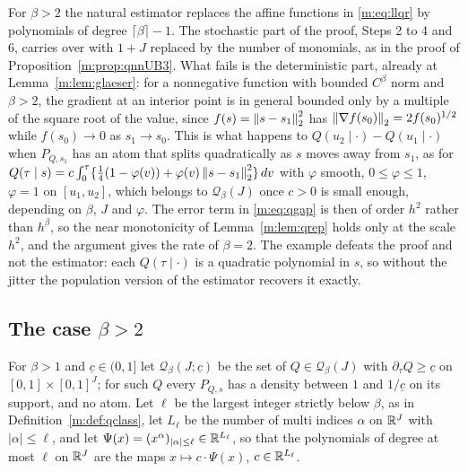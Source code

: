 \begin{remark}[Why the proof stops at $\beta=2$]\label{m:rem:qnnbeta}
For $\beta>2$ the natural estimator replaces the affine functions in \eqref{m:eq:llqr} by polynomials of degree $\lceil\beta\rceil-1$. The stochastic part of the proof, Steps 2 to 4 and 6, carries over with $1+J$ replaced by the number of monomials, as in the proof of Proposition~\ref{m:prop:qnnUB3}. What fails is the deterministic part, already at Lemma~\ref{m:lem:glaeser}: for a nonnegative function with bounded $C^\beta$ norm and $\beta>2$, the gradient at an interior point is in general bounded only by a multiple of the square root of the value, since $f(s)=\left\|s-s_1\right\|_2^2$ has $\left\|\nabla f(s_0)\right\|_2=2f(s_0)^{1/2}$ while $f(s_0)\to0$ as $s_1\to s_0$. This is what happens to $Q(u_2\mid\cdot)-Q(u_1\mid\cdot)$ when $P_{Q,s_1}$ has an atom that splits quadratically as $s$ moves away from $s_1$, as for $Q(\tau\mid s)=c\int_0^\tau\{\frac14(1-\varphi(v))+\varphi(v)\left\|s-s_1\right\|_2^2\}\,dv$ with $\varphi$ smooth, $0\le\varphi\le1$, $\varphi=1$ on $[u_1,u_2]$, which belongs to $\mathcal Q_\beta(J)$ once $c>0$ is small enough, depending on $\beta$, $J$ and $\varphi$. The error term in \eqref{m:eq:qgap} is then of order $h^2$ rather than $h^\beta$, so the near monotonicity of Lemma~\ref{m:lem:qrep} holds only at the scale $h^2$, and the argument gives the rate of $\beta=2$. The example defeats the proof and not the estimator: each $Q(\tau\mid\cdot)$ is a quadratic polynomial in $s$, so without the jitter the population version of the estimator recovers it exactly.
\end{remark}

\subsection{The case \texorpdfstring{$\beta>2$}{beta > 2}}\label{m:sec:qnnhigh}

For $\beta>1$ and $\underline c\in(0,1]$ let $\mathcal Q_\beta(J;\underline c)$ be the set of $Q\in\mathcal Q_\beta(J)$ with $\partial_\tau Q\ge\underline c$ on $[0,1]\times[0,1]^J$; for such $Q$ every $P_{Q,s}$ has a density between $1$ and $1/\underline c$ on its support, and no atom. Let $\ell$ be the largest integer strictly below $\beta$, as in Definition~\ref{m:def:qclass}, let $L_\ell$ be the number of multi indices $\alpha$ on $\mathbb{R}^J$ with $|\alpha|\le\ell$, and let $\Psi(x)=(x^\alpha)_{|\alpha|\le\ell}\in\mathbb{R}^{L_\ell}$, so that the polynomials of degree at most $\ell$ on $\mathbb{R}^J$ are the maps $x\mapsto c\cdot\Psi(x)$, $c\in\mathbb{R}^{L_\ell}$.

